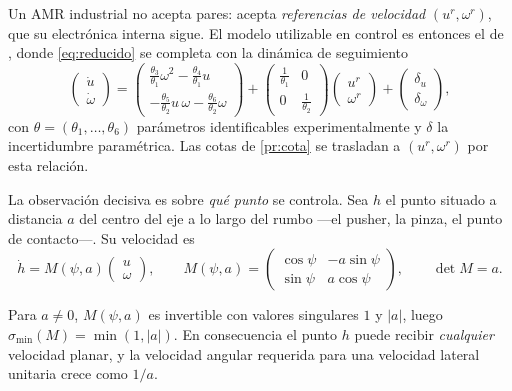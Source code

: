 Un AMR industrial no acepta pares: acepta \emph{referencias de velocidad}
$(u^{r},\omega^{r})$, que su electrónica interna sigue. El modelo utilizable en
control es entonces el de \cite{gorrostieta2019applications}, donde
\eqref{eq:reducido} se completa con la dinámica de seguimiento
\begin{equation}
  \begin{pmatrix}\dot u\\ \dot\omega\end{pmatrix}
  =\begin{pmatrix}
     \tfrac{\theta_3}{\theta_1}\omega^{2}-\tfrac{\theta_4}{\theta_1}u\\[2pt]
    -\tfrac{\theta_5}{\theta_2}u\,\omega-\tfrac{\theta_6}{\theta_2}\omega
   \end{pmatrix}
  +\begin{pmatrix}\tfrac{1}{\theta_1}&0\\ 0&\tfrac{1}{\theta_2}\end{pmatrix}
   \begin{pmatrix}u^{r}\\ \omega^{r}\end{pmatrix}
  +\begin{pmatrix}\delta_u\\ \delta_\omega\end{pmatrix},
  \label{eq:vel-dinamica}
\end{equation}
con $\theta=(\theta_1,\dots,\theta_6)$ parámetros identificables
experimentalmente y $\delta$ la incertidumbre paramétrica. Las cotas de
\cref{pr:cota} se trasladan a $(u^{r},\omega^{r})$ por esta relación.

La observación decisiva es sobre \emph{qué punto} se controla. Sea $h$ el punto
situado a distancia $a$ del centro del eje a lo largo del rumbo —el pusher, la
pinza, el punto de contacto—. Su velocidad es
\begin{equation}
  \dot h=M(\psi,a)\begin{pmatrix}u\\ \omega\end{pmatrix},
  \qquad
  M(\psi,a)=\begin{pmatrix}\cos\psi&-a\sin\psi\\ \sin\psi&a\cos\psi\end{pmatrix},
  \qquad \det M=a .
  \label{eq:fuera-eje}
\end{equation}

\begin{proposicion}
\label{pr:fuera-eje}
Para $a\neq0$, $M(\psi,a)$ es invertible con valores singulares $1$ y $|a|$,
luego $\sigma_{\min}(M)=\min(1,|a|)$. En consecuencia el punto $h$ puede recibir
\emph{cualquier} velocidad planar, y la velocidad angular requerida para una
velocidad lateral unitaria crece como $1/a$.
\end{proposicion}

